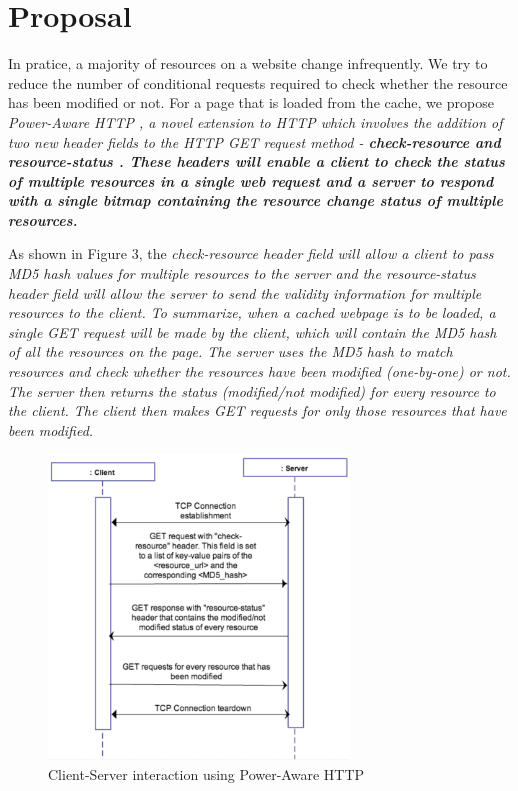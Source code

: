 \documentclass{sigplanconf}
\begin{document}
\section{Proposal}

In pratice, a majority of resources on a website change infrequently. We try to reduce the number of conditional requests required to check whether the resource has been modified or not. For a page that is loaded from the cache, we propose \it{Power-Aware HTTP} \rm , a novel extension to HTTP which involves the addition of two new header fields to the HTTP GET request method - \bf{check-resource} \rm and \bf{resource-status} \rm. These headers will enable a client to check the status of multiple resources in a single web request and a server to respond with a single bitmap containing the resource change status of multiple resources.

As shown in Figure 3, the \it{check-resource} \rm header field will allow a client to pass MD5 hash values for multiple resources to the server and the \it{resource-status} \rm header field will allow the server to send the validity information for multiple resources to the client. To summarize, when a cached webpage is to be loaded, a single GET request will be made by the client, which will contain the MD5 hash of all the resources on the page. The server uses the MD5 hash to match resources and check whether the resources have been modified (one-by-one) or not. The server then returns the status (modified/not modified) for every resource to the client. The client then makes GET requests for only those resources that have been modified.

\begin{figure}[ht!]
\centering
\includegraphics[width=80mm]{proposal}
\caption{Client-Server interaction using Power-Aware HTTP }
\label{fig:sp_gd_mnist}
\end{figure}
\end{document}

